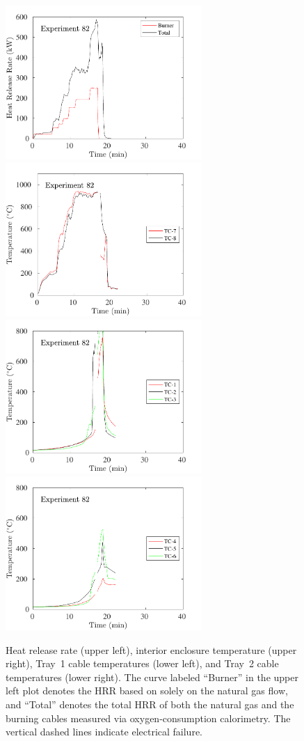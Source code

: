 \begin{figure}[H]
\includegraphics[height=2.30in]{../SCRIPT_FIGURES/Test_82_HRR} \hfill
\includegraphics[height=2.30in]{../SCRIPT_FIGURES/Test_82_TC_7-8} \\
\includegraphics[height=2.30in]{../SCRIPT_FIGURES/Test_82_TC_1-3} \hfill
\includegraphics[height=2.30in]{../SCRIPT_FIGURES/Test_82_TC_4-6}
\caption[HRR and temperatures of Experiment 82]{Heat release rate (upper left), interior enclosure temperature (upper right), Tray~1 cable temperatures (lower left), and Tray~2 cable temperatures (lower right). The curve labeled ``Burner'' in the upper left plot denotes the HRR based on solely on the natural gas flow, and ``Total'' denotes the total HRR of both the natural gas and the burning cables measured via oxygen-consumption calorimetry. The vertical dashed lines indicate electrical failure.}
\label{fig:Test_82}
\end{figure}

